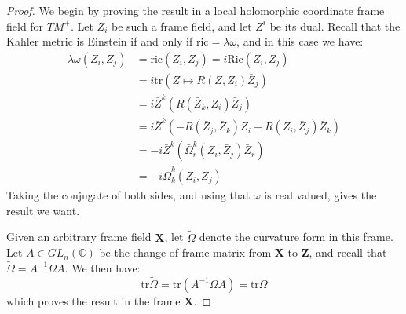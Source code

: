 \documentclass[11pt]{amsart}
\theoremstyle{definition}
\def \C{ \mathbb{C} }
\def \ric{ \text{ric} }
\def \Ric{ \text{Ric} }
\def \tr{ \text{tr} }
\def \bldX{ \mathbf{X} }
\def \bldZ{ \mathbf{Z} }
\begin{document}
\begin{proof}
We begin by proving the result in a local holomorphic coordinate frame field for $TM^{+}$.  Let $Z_i$ be such a frame field, and let $Z^i$ be its dual.  Recall that the Kahler metric is Einstein if and only if $\ric = \lambda \omega$, and in this case we have:
%
\begin{align*}
\lambda \omega( Z_i, \bar{Z}_j ) &= \ric ( Z_i, \bar{Z}_j ) = i \Ric( Z_i, \bar{Z}_j ) \\
&= i  \tr ( Z \mapsto R( Z, Z_i ) \bar{Z}_j ) \\
&= i \bar{Z}^k ( R( \bar{Z}_k, Z_i ) \bar{Z}_j ) \\
&= i \bar{Z}^k ( - R( \bar{Z}_j, \bar{Z}_k ) Z_i - R( Z_i, \bar{Z}_j ) \bar{Z}_k ) \\
&= - i \bar{Z}^k ( \bar{\Omega}^k_r ( Z_i, \bar{Z}_j ) \bar{Z}_r ) \\
&= - i \bar{\Omega}^k_k ( Z_i, \bar{Z}_j )
\end{align*}
%
Taking the conjugate of both sides, and using that $\omega$ is real valued, gives the result we want.

Given an arbitrary frame field $\bldX$, let $\tilde{ \Omega }$ denote the curvature form in this frame.  Let $A \in GL_n( \C )$ be the change of frame matrix from $\bldX$ to $\bldZ$, and recall that $\tilde{ \Omega } = A^{-1} \Omega A$.  We then have:
%
$$ \tr \tilde{ \Omega } = \tr ( A^{-1} \Omega A ) = \tr \Omega $$
%
which proves the result in the frame $\bldX$.
%
\end{proof} 
\end{document}
